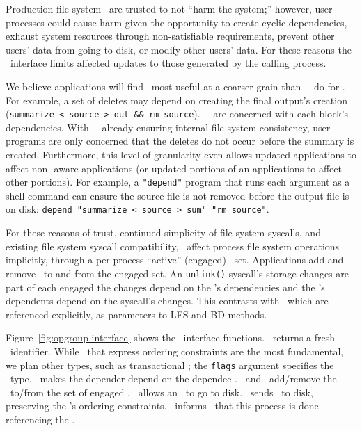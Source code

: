 Production file system \modules\ are trusted to not ``harm the
system;'' however, user processes could cause harm given the
opportunity to create cyclic dependencies, exhaust system resources
through non-satisfiable requirements, prevent other users' data from
going to disk, or modify other users' data. For these reasons the
\opgroup\ interface limits affected updates to those generated by the
calling process.

We believe applications will find \opgroups\ most useful at a coarser
grain than \Kudos\ \modules\ do for \chdescs. For example, a set of
deletes may depend on creating the final output's creation
(\texttt{summarize < source > out \&\& rm source}). \Kudos\ \modules\
are concerned with each block's dependencies. With \Kudos\ \modules\
already ensuring internal file system consistency, user programs are
only concerned that the deletes do not occur before the summary is
created.
%
Furthermore, this level of granularity even allows updated
applications to affect non-\opgroup{}-aware applications (or updated
portions of an applications to affect other portions). For example, a
\texttt{"depend"} program that runs each argument as a shell command
can ensure the source file is not removed before the output file is on
disk: \texttt{depend "summarize < source > sum" "rm source"}.

For these reasons of trust, continued simplicity of file system
syscalls, and existing file system syscall compatibility, \opgroups\
affect process file system operations implicitly, through a
per-process ``active'' (engaged) \opgroup\ set.  Applications add and
remove \opgroups\ to and from the engaged set. An \verb+unlink()+
syscall's storage changes are part of each engaged \opgroup\; the
changes depend on the \opgroup{}'s dependencies and the \opgroup{}'s
dependents depend on the syscall's changes. This contrasts with
\chdescs\ which are referenced explicitly, as parameters to LFS and BD
methods.

Figure~\ref{fig:opgroup-interface} shows the \opgroup\ interface functions.
\opgroupCreate\ returns a fresh \opgroup\ identifier. While
\opgroups\ that express ordering constraints are the most fundamental,
we plan other types, such as transactional \opgroups; the
\texttt{flags} argument specifies the \opgroup\ type.
\opgroupAddDepend\ makes the depender depend on the dependee \opgroup.
\opgroupEngage\ and \opgroupDisengage\ add/remove the \opgroup\ to/from
the set of engaged \opgroups. \opgroupRelease\ allows an \opgroup\ to go
to disk. \opgroupSync\ sends \anopgroup\ to disk, preserving
the \opgroup{}'s ordering constraints. \opgroupAbandon\ informs \Kudos\
that this process is done referencing the \opgroup.


